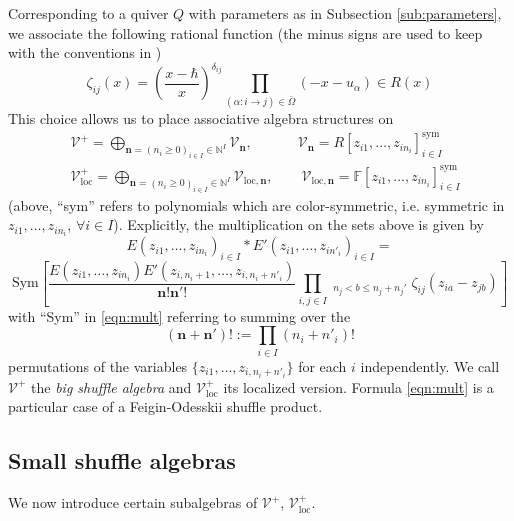\documentclass{amsart}
\def\BF{{\mathbb{F}}}
\def\CV{{\mathcal{V}}}
\def\sym{\textrm{sym}}
\def\nn{{\mathbb{N}^I}}
\def\bn{{\boldsymbol{n}}}
\def\edge{\Omega}
\def\ring{R}
\begin{document}
Corresponding to a quiver $Q$ with parameters as in Subsection \ref{sub:parameters}, we associate the following rational function (the minus signs are used to keep with the conventions in \cite{jindalnegutbps})
\begin{equation}
\label{eqn:zeta}
\zeta_{ij}(x) = \left( \frac {x - \hbar}x \right)^{\delta_{ij}} \prod_{(\alpha : i \rightarrow j) \in \bar{\edge}} \left( - x - u_\alpha \right) \in \ring(x)
\end{equation}
This choice allows us to place associative algebra structures on
\begin{align*}
&\CV^+ = \bigoplus_{\bn = (n_i \geq 0)_{i \in I} \in \nn} \CV_{\bn}, \qquad \quad \ \CV_{\bn}= R[z_{i1},\dots,z_{in_i}]_{i \in I}^{\sym} \\
&\CV^+_{\text{loc}} = \bigoplus_{\bn = (n_i \geq 0)_{i \in I} \in \nn} \CV_{\text{loc},\bn}, \qquad \CV_{\text{loc},\bn}=\BF[z_{i1},\dots,z_{in_i}]_{i \in I}^{\sym}
\end{align*}
(above, ``sym'' refers to polynomials which are color-symmetric, i.e. symmetric in $z_{i1},\dots,z_{in_i}$, $\forall i \in I$). Explicitly, the multiplication on the sets above is given by
\begin{equation}
\label{eqn:mult}
E( z_{i1}, \dots, z_{i n_i})_{i \in I} * E'(z_{i1}, \dots,z_{i n'_i})_{i \in I} = 
\end{equation}
$$
\textrm{Sym} \left[ \frac {E(z_{i1}, \dots, z_{in_i}) E'(z_{i,n_i+1}, \dots, z_{i,n_i+n'_i})}{\bn! \bn'!}
\prod_{i,j \in I} \mathop{\prod_{1 \leq a \leq n_i}}_{n_j < b \leq n_j+n_j'} \zeta_{ij} \left( z_{ia} - z_{jb} \right) \right]
$$
with ``Sym'' in \eqref{eqn:mult} referring to summing over the
\begin{equation*}
(\bn+\bn')! := \prod_{i\in I} (n_i+n'_i)!
\end{equation*}
permutations of the variables $\{z_{i1}, \dots, z_{i,n_i+n'_i}\}$ for each $i$ independently. We call $\CV^+$ the \emph{big shuffle algebra} and $\CV^+_{\text{loc}}$ its localized version. Formula \eqref{eqn:mult} is a particular case of a Feigin-Odesskii shuffle product.

\medskip

\subsection{Small shuffle algebras}
\label{sub:small shuffle}

We now introduce certain subalgebras of $\CV^+$, $\CV^+_{\text{loc}}$.
\end{document}
